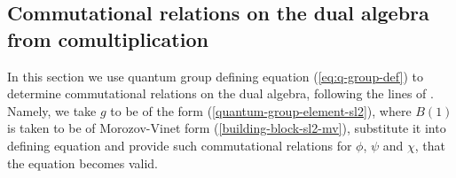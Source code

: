 \documentclass{article}
\newcommand{\lb}{\left (}
\newcommand{\rb}{\right )}
\newcommand{\be}{\begin{eqnarray}}
\newcommand{\ee}{\end{eqnarray}}
\newcommand {\?}{\textit{???}}
\newcommand{\matd}[4]{\lb \begin{array}{cc}
#1 & #2 \\ #3 & #4
\end{array} \rb}
\newcommand{\delabel}[1]{(\ref{#1})}
\newcommand{\Honed}[1]{\lb \begin{array}{ccc}
#1^{1/2} & 0 \\ 0 & #1^{-1/2}
\end{array} \rb}
\newcommand{\Eoned}[1]{\lb \begin{array}{cc}
1 & #1 \\ 0 & 1
\end{array} \rb}
\newcommand{\Foned}[1]{\lb \begin{array}{cc}
1 & 0 \\ #1 & 1
\end{array} \rb}
\begin{document}







\subsection{Commutational relations on the dual algebra from comultiplication}
\label{comm-relations-dual-algebra-sl2}

In this section we use quantum group defining equation \delabel{eq:q-group-def} to determine
commutational relations on the dual algebra, following the lines of \cite{MV1}.
 Namely, we take $g$ to be of the form
\delabel{quantum-group-element-sl2}, where $B(1)$ is taken to be of Morozov-Vinet form
\delabel{building-block-sl2-mv}, substitute it into defining equation and provide
such commutational relations for $\phi$, $\psi$ and $\chi$, that the equation becomes valid.
\end{document}

